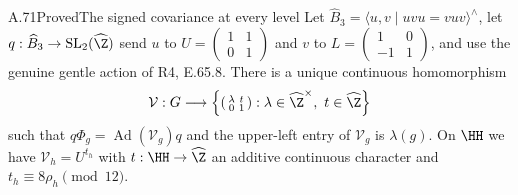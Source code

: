 \begin{statement}{A.71}{Proved}{The signed covariance at every level}
Let $\widehat B_3=\langle u,v\mid uvu=vuv\rangle^{\wedge}$,
let $q:\widehat B_3\to\mathrm{SL}_2(\widehat\Z)$ send
$u$ to $U=\left(\begin{smallmatrix}1&1\\0&1\end{smallmatrix}\right)$
and $v$ to $L=\left(\begin{smallmatrix}1&0\\-1&1\end{smallmatrix}\right)$,
and use the genuine gentle action of R4, E.65.8. There is a unique
continuous homomorphism
\[
 \mathcal V:G\longrightarrow
 \left\{\left(\begin{smallmatrix}\lambda&t\\0&1\end{smallmatrix}\right):
       \lambda\in\widehat\Z^{\times},\ t\in\widehat\Z\right\}
\]
such that $q\Phi_g=\operatorname{Ad}(\mathcal V_g)q$ and
the upper-left entry of $\mathcal V_g$ is $\lambda(g)$.
On $\HH$ we have $\mathcal V_h=U^{t_h}$ with
$t:\HH\to\widehat\Z$ an additive continuous character and
$t_h\equiv8\rho_h\pmod{12}$.
\end{statement}
